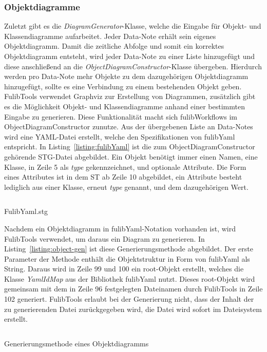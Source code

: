 \subsubsection{Objektdiagramme}\label{subsubsec:objektdiagramme}
Zuletzt gibt es die \textit{DiagramGenerator}-Klasse, welche die Eingabe für Objekt- und Klassendiagramme aufarbeitet.
Jeder Data-Note erhält sein eigenes Objektdiagramm.
Damit die zeitliche Abfolge und somit ein korrektes Objektdiagramm entsteht, wird jeder Data-Note zu einer Liste hinzugefügt und diese anschließend an die
\textit{ObjectDiagramConstructor}-Klasse übergeben.
Hierdurch werden pro Data-Note mehr Objekte zu dem dazugehörigen Objektdiagramm hinzugefügt, sollte es eine Verbindung zu einem bestehenden Objekt geben.
FulibTools verwendet Graphviz zur Erstellung von Diagrammen, zusätzlich gibt es die Möglichkeit Objekt- und Klassendiagramme anhand einer bestimmten Eingabe zu generieren.
Diese Funktionalität macht sich fulibWorkflows im ObjectDiagramConstructor zunutze.
Aus der übergebenen Liste an Data-Notes wird eine YAML-Datei erstellt, welche den Spezifikationen von fulibYaml entspricht.
In Listing~\ref{listing:fulibYaml} ist die zum ObjectDiagramConstructor gehörende \ac{STG}-Datei abgebildet.
Ein Objekt benötigt immer einen Namen, eine Klasse, in Zeile 5 als \textit{type} gekennzeichnet, und optionale Attribute.
Die Form eines Attributes ist in dem \ac{ST} ab Zeile 10 abgebildet, ein Attribute besteht lediglich aus einer Klasse, erneut \textit{type} genannt, und dem
dazugehörigen Wert.

\begin{listing}[!ht]
    \inputminted{c}{listings/3.1.4/FulibYaml.stg}
    \caption{FulibYaml.stg}
    \label{listing:fulibYaml}
\end{listing}

Nachdem ein Objektdiagramm in fulibYaml-Notation vorhanden ist, wird FulibTools verwendet, um daraus ein Diagram zu generieren.
In Listing~\ref{listing:object-gen} ist diese Generierungsmethode abgebildet.
Der erste Parameter der Methode enthält die Objektstruktur in Form von fulibYaml als String.
Daraus wird in Zeile 99 und 100 ein root-Objekt erstellt, welches die Klasse \textit{YamlIdMap} aus der Bibliothek fulibYaml nutzt.
Dieses root-Objekt wird gemeinsam mit dem in Zeile 96 festgelegten Dateinamen durch FulibTools in Zeile 102 generiert.
FulibTools erlaubt bei der Generierung nicht, dass der Inhalt der zu generierenden Datei zurückgegeben wird, die Datei wird sofort im Dateisystem erstellt.

\begin{listing}[!ht]
    \inputminted[firstnumber=95]{java}{listings/3.1.4/ObjectGeneration.java}
    \caption{Generierungsmethode eines Objektdiagramms}
    \label{listing:object-gen}
\end{listing}

